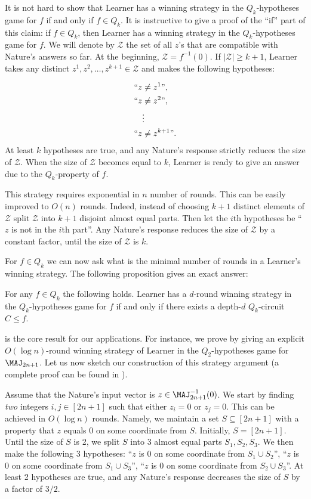 It is not hard to show that Learner has a winning strategy in the $Q_k$-hypotheses game for $f$ if and only if $f\in Q_k$. It is instructive to give a proof of the ``if'' part of this claim: if $f\in Q_k$, then Learner has a winning strategy in the $Q_k$-hypotheses game for $f$. We will denote by $\mathcal{Z}$ the set of all $z$'s that are compatible with Nature's answers so far. At the beginning, $\mathcal{Z} = f^{-1}(0)$. If $|\mathcal{Z}| \ge k + 1$, Learner takes any distinct $z^1, z^2, \ldots, z^{k + 1} \in \mathcal{Z}$ and makes the following hypotheses:

\begin{align*}
``z&\neq z^1\mbox{''}, \\
``z&\neq z^2\mbox{''}, \\
&\vdots \\
``z&\neq z^{k + 1}\mbox{''}.
\end{align*}
At least $k$ hypotheses are true, and any Nature's response strictly reduces the size of $\mathcal{Z}$. When the size of $\mathcal{Z}$ becomes equal to $k$, Learner is ready to give an answer due to the $Q_k$-property of $f$.

This strategy requires exponential in $n$ number of rounds. This can be easily improved to $O(n)$ rounds. Indeed, instead of choosing $k + 1$ distinct elements of $\mathcal{Z}$ split $\mathcal{Z}$ into $k + 1$ disjoint almost equal parts. Then let the $i$th hypotheses be ``$z$ is not in the $i$th part''. Any Nature's response reduces the size of $\mathcal{Z}$ by a constant factor, until the size of $\mathcal{Z}$ is $k$.

For $f\in Q_k$ we can now ask what is the minimal number of rounds in a Learner's winning strategy. The following proposition gives an exact answer:
\begin{proposition}
\label{games_Q_k}
For any $f\in Q_k$ the following holds. Learner has a $d$-round winning strategy in the $Q_k$-hypotheses game for $f$ if and only if there exists a
depth-$d$ $Q_k$-circuit $C\le f$.
\end{proposition}

 is the core result for our applications. For instance, we prove  by giving an explicit $O(\log n)$-round winning strategy of Learner in the $Q_2$-hypotheses game for $\MAJ_{2n + 1}$. Let us now sketch our construction of this strategy argument (a complete proof can be found in ).

Assume that the Nature's input vector is $z\in\MAJ_{2n + 1}^{-1}(0)$. We start by finding \emph{two} integers $i, j \in [2n + 1]$ such that either $z_i = 0$ or $z_j = 0$. This can be achieved in $O(\log n)$ rounds. Namely, we maintain a set $S\subseteq [2n + 1]$ with a property that $z$ equals $0$ on some coordinate from $S$. Initially, $S = [2n + 1]$. Until the size of $S$ is 2, we split $S$ into 3 almost equal parts $S_1, S_2, S_3$. We then make the following 3 hypotheses: ``$z$ is $0$ on some coordinate from $S_1\cup S_2$'', ``$z$ is $0$ on some coordinate from $S_1\cup S_3$'', ``$z$ is $0$ on some coordinate from $S_2\cup S_3$''. At least 2 hypotheses are true, and any Nature's response decreases the size of $S$ by a factor of $3/2$.

